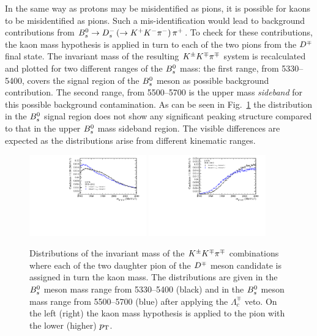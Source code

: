 In the same way as protons may be misidentified as pions, it is possible for kaons
to be misidentified as pions. Such a mis-identification would lead to background
contributions from $B^0_s\rightarrow D^-_s\left(\rightarrow K^+K^-\pi^-\right)\pi^+$. To check for
these contributions, the kaon mass hypothesis is applied in turn to each of the two pions
from the $D^\mp$ final state. The invariant mass of the resulting
$K^\pm K^\mp\pi^\mp$ system is recalculated and plotted for two different ranges of
the $B^0_s$ mass: the first range, from \SIrange{5330}{5400}{\MeVcc}, covers the
signal region of the $B^0_s$ meson as possible background
contribution. The
second range, from \SIrange{5500}{5700}{\MeVcc} is the upper mass \emph{sideband} for
this possible background contamination. As can be seen in Fig.~\ref{fig:Dsveto}
the distribution in the $B^0_s$ signal region does not
show any significant peaking structure compared to that in the upper $B^0_s$ mass sideband
region. The visible differences are expected as the distributions arise from
different kinematic ranges.
%
\begin{figure}[t]
	\begin{center}
		\includegraphics[width=0.45\textwidth]{02Selection/figs/DsHypo1.pdf}
		\includegraphics[width=0.45\textwidth]{02Selection/figs/DsHypo2.pdf}
	\end{center}
        \vspace{-2mm}
	\caption{Distributions of the invariant mass of the $K^\pm K^\mp\pi^\mp$ combinations where each of the two 
	daughter pion of the $D^\mp$ meson candidate is assigned in turn the kaon mass. The
	distributions are given in the $B^0_s$ meson mass range from
	\SIrange{5330}{5400}{\MeVcc} (black) and in the  $B^0_s$ meson mass range
	from \SIrange{5500}{5700}{\MeVcc} (blue) after applying the $\Lambda_c^{\mp}$ veto.
	On the left (right) the kaon mass hypothesis is applied to the pion with the lower (higher) $\mbox{$p_{\rm T}$}$.}
	\label{fig:Dsveto}
\end{figure}
